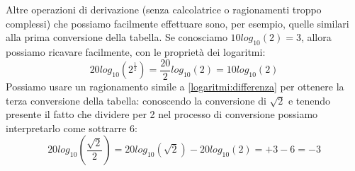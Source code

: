 \documentclass[a4paper,11pt]{report}
\begin{document}
Altre operazioni di derivazione (senza calcolatrice o ragionamenti troppo complessi) che possiamo facilmente effettuare sono, per esempio, quelle similari alla prima conversione della tabella. Se conosciamo $10log_{10}(2) = 3$, allora possiamo ricavare facilmente, con le proprietà dei logaritmi:
$$
  20log_{10}(2^{\frac{1}{2}}) = \frac{20}{2}log_{10}(2) = 10log_{10}(2)
$$
Possiamo usare un ragionamento simile a \ref{logaritmi:differenza} per ottenere la terza conversione della tabella: conoscendo la conversione di $\sqrt{2}$ e tenendo presente il fatto che dividere per 2 nel processo di conversione possiamo interpretarlo come sottrarre 6:
$$
  20log_{10}(\frac{\sqrt{2}}{2}) = 20log_{10}(\sqrt{2})-20log_{10}(2) = +3-6 = -3
$$ 
\end{document}
